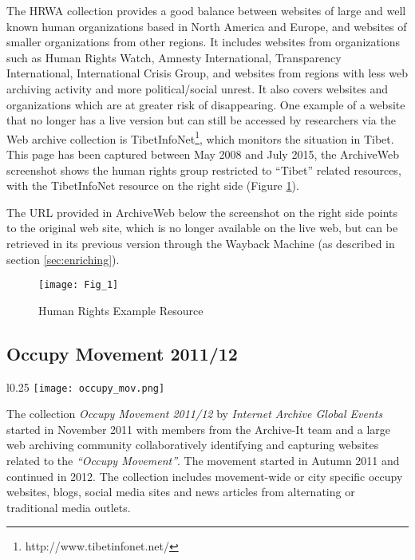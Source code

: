 \documentclass{llncs}
\begin{document}
\endgroup

The HRWA collection provides a good balance between websites of large
and well known human organizations based in North America and Europe,
and websites of smaller organizations from other regions. It includes
websites from organizations such as Human Rights Watch, Amnesty
International, Transparency International, International Crisis Group,
and websites from regions with less web archiving activity and more
political/social unrest. It also covers websites and organizations
which are at greater risk of disappearing. One example of a website
that no longer has a live version but can still be accessed by
researchers via the Web archive collection is TibetInfoNet\footnote{http://www.tibetinfonet.net/}, which
monitors the situation in Tibet. This
page has been captured between May 2008 and July 2015, the ArchiveWeb
screenshot shows the human rights group restricted to ``Tibet''
related resources, with the TibetInfoNet resource on the right side
(Figure \ref{hrwa_ex}). 

The URL provided in ArchiveWeb below the screenshot on the right side
points to the original web site, which is no longer available on the
live web, but can be retrieved in its previous version through the
Wayback Machine (as described in section \ref{sec:enriching}).

\begin{figure}[hbp]
\texttt{[image: Fig\_1]}
\caption{Human Rights Example Resource}
\label{hrwa_ex}
\end{figure}

\subsection{Occupy Movement 2011/12}

\begingroup

\setlength{\intextsep}{5pt}
\begin{wrapfigure}{l}{0.25\textwidth}
\texttt{[image: occupy\_mov.png]} 
\label{occupy}
\end{wrapfigure}

The collection \textit{Occupy Movement 2011/12} by \textit{Internet
  Archive Global Events} started in November 2011 with members from
the Archive-It team and a large web archiving community
collaboratively identifying and capturing websites related to the
\textit{``Occupy Movement''}. The movement started in Autumn 
2011 and continued in 2012. The collection includes movement-wide or
city specific occupy websites, blogs, social media sites and news
articles from alternating or traditional media outlets.
\end{document}
